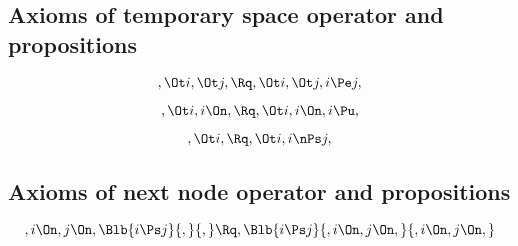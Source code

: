 \bigskip
\bigskip
\bigskip
\bigskip
\subsection{ Axioms of  temporary space operator and propositions}
\[, \Ot i, \Ot j, \Rq , \Ot i, \Ot j, i \Pe j,\]

\[, \Ot i, i \On, \Rq , \Ot i, i \On, i \Pu,\]

\[,\Ot i, \Rq , \Ot i, i \nPs j,\]


\bigskip
\bigskip
\bigskip
\bigskip
\subsection{ Axioms of next node operator and propositions}
\[,i \On, j \On, \Blb{i \Ps j}{,}{,} \Rq , \Blb{i \Ps j}{,i \On, j \On,}{,i \On, j \On,}\]











